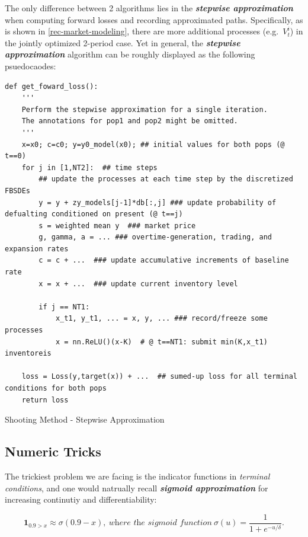 \documentclass[a4paper,10pt]{article}
\newcommand{\1}{\mathbf{1}}
\begin{document}
The only difference between 2 algorithms lies in the \textbf{\textit{stepwise
approximation}} when computing forward losses and recording approximated
paths. Specifically, as is shown in \ref{rec-market-modeling}, there are more additional processes (e.g.~\(V_t^i\)) in the jointly optimized 2-period case. Yet in general, the \textbf{\textit{stepwise
approximation}} algorithm can be roughly displayed as the following
psuedocaodes:

\begin{algorithm}[h]
\begin{verbatim}
def get_foward_loss():
    '''
    Perform the stepwise approximation for a single iteration. 
    The annotations for pop1 and pop2 might be omitted.
    '''
    x=x0; c=c0; y=y0_model(x0); ## initial values for both pops (@ t==0)
    for j in [1,NT2]:  ## time steps
        ## update the processes at each time step by the discretized FBSDEs
        y = y + zy_models[j-1]*db[:,j] ### update probability of defualting conditioned on present (@ t==j)
        s = weighted mean y  ### market price
        g, gamma, a = ... ### overtime-generation, trading, and expansion rates 
        c = c + ...  ### update accumulative increments of baseline rate
        x = x + ...  ### update current inventory level

        if j == NT1:
            x_t1, y_t1, ... = x, y, ... ### record/freeze some processes 
            x = nn.ReLU()(x-K)  # @ t==NT1: submit min(K,x_t1) inventoreis

    loss = Loss(y,target(x)) + ...  ## sumed-up loss for all terminal conditions for both pops
    return loss 
\end{verbatim}
\caption{Shooting Method - Stepwise Approximation} 
\label{alg:stepwise-approx}
\end{algorithm}

\subsection{Numeric Tricks}\label{numeric-tricks}

The trickiest problem we are facing is the indicator functions in
\emph{terminal conditions}, and one would natrually recall
\textbf\textit{sigmoid approximation} for increasing continutiy and
differentiability:

\begin{equation}
    \1_{0.9>x} \approx \sigma(0.9-x), ~\textit{where the sigmoid function}~\sigma(u)=\frac{1}{1+e^{-u/\delta}}.
\end{equation}
\end{document}
